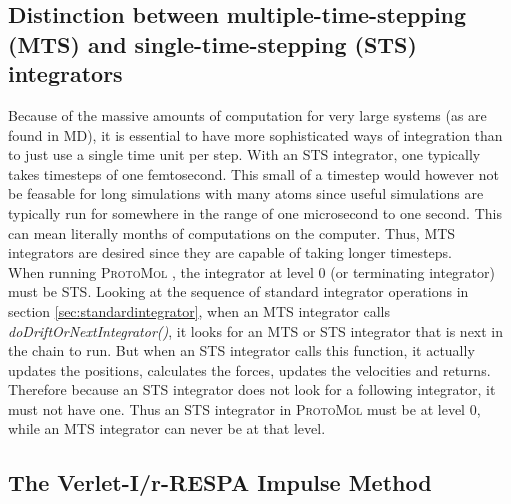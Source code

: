 \documentclass[11pt]{report}
\newcommand{\ProtoMol}{\textsc{ProtoMol }}
\begin{document}
\begin{appendix}
\subsection{Distinction between multiple-time-stepping (MTS) and single-time-stepping (STS) integrators}

Because of the massive amounts of computation for very large systems
(as are found in MD), it is essential to have more sophisticated ways
of integration than to just use a single time unit per step.  With an
STS integrator, one typically takes timesteps of one femtosecond.
This small of a timestep would however not be feasable for long
simulations with many atoms since useful simulations are typically run
for somewhere in the range of one microsecond to one second.  This can
mean literally months of computations on the computer.  Thus, MTS
integrators are desired since they are capable of taking longer
timesteps. \\


When running \ProtoMol, the integrator at level 0 (or terminating
integrator) must be STS.  Looking at the sequence of standard
integrator operations in section \ref{sec:standardintegrator}, when an MTS integrator calls
{\it doDriftOrNextIntegrator()}, it looks for an MTS or STS integrator
that is next in the chain to run.  But when an STS integrator calls
this function, it actually updates the positions, calculates the
forces, updates the velocities and returns.  Therefore because an STS
integrator does not look for a following integrator, it must not have
one.  Thus an STS integrator in \ProtoMol must be at level 0, while an
MTS integrator can never be at that level. \\


\subsection{The Verlet-I/r-RESPA Impulse Method ~\cite{Izag99}} 


\end{appendix}
\end{document}

